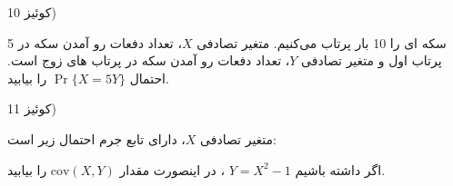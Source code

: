 \documentclass[10pt,letterpaper]{report}
\newcommand{\eqn}[1]{
\[\begin{split}
#1
\end{split}\]
}
\begin{document}
کوئیز 10)

سکه ای را 10 بار پرتاب می‌کنیم. متغیر تصادفی 
$
X
$،
تعداد دفعات رو آمدن سکه در 5 پرتاب اول و متغیر تصادفی $Y$، تعداد دفعات رو آمدن سکه در پرتاب های زوج است. احتمال 
$
\Pr\{X=5Y\}
$
را بیابید.

کوئیز 11)

متغیر تصادفی $X$، دارای تابع جرم احتمال زیر است:

اگر داشته باشیم
$
Y=X^2-1
$
، در اینصورت مقدار
$
\text{cov}(X,Y)
$
را بیابید.


\end{document}
